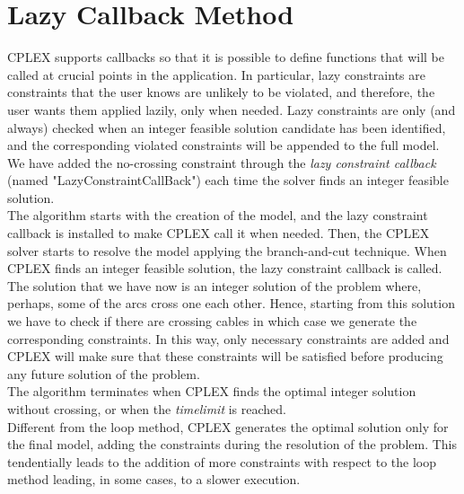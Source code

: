 \section{Lazy Callback Method}
\textsc{CPLEX} supports callbacks so that it is possible to define functions that will be called at crucial points in the application. In particular, lazy constraints are constraints that the user knows are unlikely to be violated, and therefore, the user
wants them applied lazily, only when needed. Lazy constraints are only (and always) checked when an integer feasible solution candidate has been identified, and the corresponding violated constraints will be appended to the full model. \\
We have added the no-crossing constraint through the \textit{lazy constraint callback} (named "LazyConstraintCallBack") each time the solver finds an integer feasible solution. \\
The algorithm starts with the creation of the model, and the lazy constraint callback is installed to make \textsc{CPLEX} call it when needed. Then, the \textsc{CPLEX} solver starts to resolve the model applying the branch-and-cut technique. When \textsc{CPLEX} finds an integer feasible solution, the lazy constraint callback is called. The solution that we have now is an integer solution of the problem where, perhaps, some of the arcs cross one each other. Hence, starting from this solution we have to check if there are crossing cables in which case we generate the corresponding constraints. In this way, only necessary constraints are added and \textsc{CPLEX} will make sure that these constraints will be satisfied before producing any future solution of the problem.\\
The algorithm terminates when \textsc{CPLEX} finds the optimal integer solution without crossing, or when the \textit{timelimit} is reached. \\
Different from the loop method, \textsc{CPLEX} generates the optimal solution only for the final model, adding the constraints during the resolution of the problem. This tendentially leads to the addition of more constraints with respect to the loop method leading, in some cases, to a slower execution.

